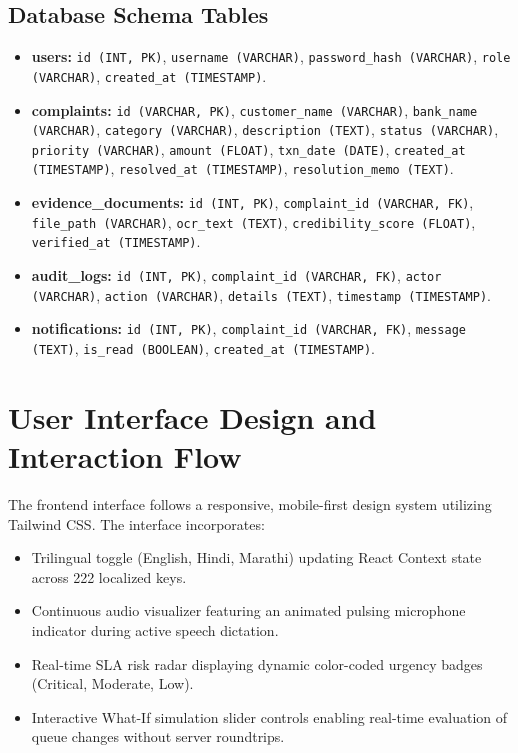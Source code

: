 \subsection{Database Schema Tables}
\begin{itemize}
    \item \textbf{users:} \texttt{id (INT, PK)}, \texttt{username (VARCHAR)}, \texttt{password\_hash (VARCHAR)}, \texttt{role (VARCHAR)}, \texttt{created\_at (TIMESTAMP)}.
    \item \textbf{complaints:} \texttt{id (VARCHAR, PK)}, \texttt{customer\_name (VARCHAR)}, \texttt{bank\_name (VARCHAR)}, \texttt{category (VARCHAR)}, \texttt{description (TEXT)}, \texttt{status (VARCHAR)}, \texttt{priority (VARCHAR)}, \texttt{amount (FLOAT)}, \texttt{txn\_date (DATE)}, \texttt{created\_at (TIMESTAMP)}, \texttt{resolved\_at (TIMESTAMP)}, \texttt{resolution\_memo (TEXT)}.
    \item \textbf{evidence\_documents:} \texttt{id (INT, PK)}, \texttt{complaint\_id (VARCHAR, FK)}, \texttt{file\_path (VARCHAR)}, \texttt{ocr\_text (TEXT)}, \texttt{credibility\_score (FLOAT)}, \texttt{verified\_at (TIMESTAMP)}.
    \item \textbf{audit\_logs:} \texttt{id (INT, PK)}, \texttt{complaint\_id (VARCHAR, FK)}, \texttt{actor (VARCHAR)}, \texttt{action (VARCHAR)}, \texttt{details (TEXT)}, \texttt{timestamp (TIMESTAMP)}.
    \item \textbf{notifications:} \texttt{id (INT, PK)}, \texttt{complaint\_id (VARCHAR, FK)}, \texttt{message (TEXT)}, \texttt{is\_read (BOOLEAN)}, \texttt{created\_at (TIMESTAMP)}.
\end{itemize}

\section{User Interface Design and Interaction Flow}
The frontend interface follows a responsive, mobile-first design system utilizing Tailwind CSS. The interface incorporates:
\begin{itemize}
    \item Trilingual toggle (English, Hindi, Marathi) updating React Context state across 222 localized keys.
    \item Continuous audio visualizer featuring an animated pulsing microphone indicator during active speech dictation.
    \item Real-time SLA risk radar displaying dynamic color-coded urgency badges (Critical, Moderate, Low).
    \item Interactive What-If simulation slider controls enabling real-time evaluation of queue changes without server roundtrips.
\end{itemize}

